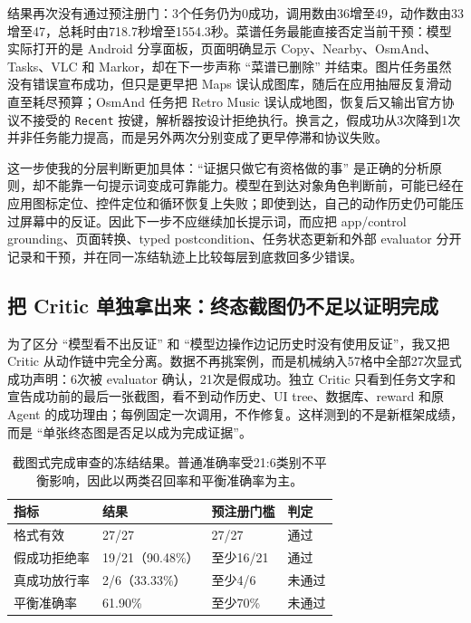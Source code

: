 \documentclass[12pt,a4paper]{ctexart}
\newcommand{\code}[1]{\texttt{#1}}
\begin{document}
结果再次没有通过预注册门：3个任务仍为0成功，调用数由36增至49，动作数由33增至47，总耗时由718.7秒增至1554.3秒。菜谱任务最能直接否定当前干预：模型实际打开的是 Android 分享面板，页面明确显示 Copy、Nearby、OsmAnd、Tasks、VLC 和 Markor，却在下一步声称 ``菜谱已删除'' 并结束。图片任务虽然没有错误宣布成功，但只是更早把 Maps 误认成图库，随后在应用抽屉反复滑动直至耗尽预算；OsmAnd 任务把 Retro Music 误认成地图，恢复后又输出官方协议不接受的 \code{Recent} 按键，解析器按设计拒绝执行。换言之，假成功从3次降到1次并非任务能力提高，而是另外两次分别变成了更早停滞和协议失败。

这一步使我的分层判断更加具体：``证据只做它有资格做的事'' 是正确的分析原则，却不能靠一句提示词变成可靠能力。模型在到达对象角色判断前，可能已经在应用图标定位、控件定位和循环恢复上失败；即使到达，自己的动作历史仍可能压过屏幕中的反证。因此下一步不应继续加长提示词，而应把 app/control grounding、页面转换、typed postcondition、任务状态更新和外部 evaluator 分开记录和干预，并在同一冻结轨迹上比较每层到底救回多少错误。

\subsection{把 Critic 单独拿出来：终态截图仍不足以证明完成}

为了区分 ``模型看不出反证'' 和 ``模型边操作边记历史时没有使用反证''，我又把 Critic 从动作链中完全分离。数据不再挑案例，而是机械纳入57格中全部27次显式成功声明：6次被 evaluator 确认，21次是假成功。独立 Critic 只看到任务文字和宣告成功前的最后一张截图，看不到动作历史、UI tree、数据库、reward 和原 Agent 的成功理由；每例固定一次调用，不作修复。这样测到的不是新框架成绩，而是 ``单张终态图是否足以成为完成证据''。

\begin{table}[H]
    \centering
    \caption{截图式完成审查的冻结结果。普通准确率受21:6类别不平衡影响，因此以两类召回率和平衡准确率为主。}
    \label{tab:offline-verifier}
    \small
    \begin{tabularx}{\textwidth}{p{4.8cm}p{3.0cm}p{3.0cm}Y}
        \toprule
        指标 & 结果 & 预注册门槛 & 判定 \\
        \midrule
        格式有效 & 27/27 & 27/27 & 通过 \\
        假成功拒绝率 & 19/21（90.48\%） & 至少16/21 & 通过 \\
        真成功放行率 & 2/6（33.33\%） & 至少4/6 & 未通过 \\
        平衡准确率 & 61.90\% & 至少70\% & 未通过 \\
        \bottomrule
    \end{tabularx}
\end{table}
\end{document}
